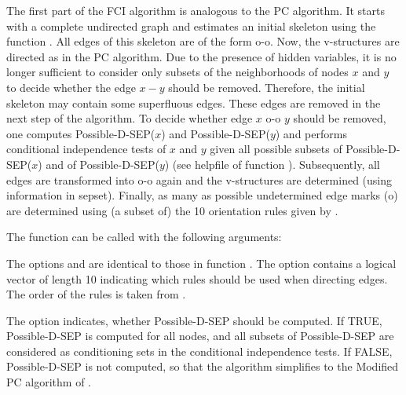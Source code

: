 \documentclass[article]{jss}
\begin{document}
The first part of the FCI algorithm is analogous to the PC algorithm. It
starts with a complete undirected graph and estimates an initial skeleton
using the function . All edges of this skeleton are of the
form o-o. Now, the v-structures are directed as in the PC algorithm. Due to the presence of hidden variables, it is no longer
sufficient to consider only subsets of the neighborhoods of nodes $x$ and
$y$ to decide whether the edge $x-y$ should be removed.  Therefore, the
initial skeleton may contain some superfluous edges.  These edges are
removed in the next step of the algorithm. To decide whether edge $x$ o-o $y$
should be removed, one computes Possible-D-SEP($x$) and Possible-D-SEP($y$)
and performs conditional independence tests of $x$ and $y$ given all
possible subsets of Possible-D-SEP($x$) and of Possible-D-SEP($y$) (see
helpfile of function ). Subsequently, all edges are transformed into o-o again and the v-structures are
determined (using information in sepset).  Finally, as many as possible
undetermined edge marks (o) are determined using (a subset of) the 10
orientation rules given by \cite{Zhang08-orientation-rules}.

The function can be called with the following arguments:

     
The options  and  are identical to those in function
. The option  contains a logical vector of
length 10 indicating which rules should be used when directing edges. The
order of the rules is taken from \cite{Zhang08-orientation-rules}.
     
The option  indicates, whether Possible-D-SEP should be
computed. If TRUE, Possible-D-SEP is computed for all nodes, and all
subsets of Possible-D-SEP are considered as conditioning sets in the
conditional independence tests. If FALSE, Possible-D-SEP is not computed,
so that the algorithm simplifies to the Modified PC algorithm of \cite{SpirtesEtAl00}.
\end{document}
